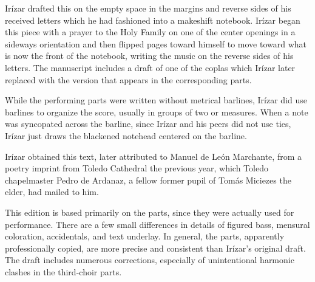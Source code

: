 \begin{notesources}
    \begin{source}
    \end{source}
    \begin{source}
    \end{source}
    \begin{source}
    \end{source}
    \begin{source}
    \end{source}
\end{notesources}

Irízar drafted this  on the empty space in the
margins and reverse sides of his received letters which he had fashioned into
a makeshift notebook.
Irízar began this piece with a prayer to the Holy Family on one of the center
openings in a sideways orientation and then flipped pages toward himself to
move toward what is now the front of the notebook, writing the music on the
reverse sides of his letters.
The manuscript includes a draft of one of the coplas which Irízar later
replaced with the version that appears in the corresponding parts.

While the performing parts were written without metrical barlines, Irízar did
use barlines to organize the score, usually in groups of two 
or measures.
When a note was syncopated across the barline, since Irízar and his peers did
not use ties, Irízar just draws the blackened notehead centered on the
barline.

Irízar obtained this text, later attributed to Manuel de León Marchante, from
a poetry imprint from Toledo Cathedral the previous year, which Toledo
chapelmaster Pedro de Ardanaz, a fellow former pupil of Tomás Miciezes the
elder, had mailed to him.%
    \Autocite{Rodriguez:SoloMadrid}

This edition is based primarily on the parts, since they were actually used
for performance.
There are a few small differences in details of figured bass, mensural
coloration, accidentals, and text underlay.
In general, the parts, apparently professionally copied, are more precise and
consistent than Irízar's original draft.
The draft includes numerous corrections, especially of unintentional harmonic
clashes in the third-choir parts.

\endinput
